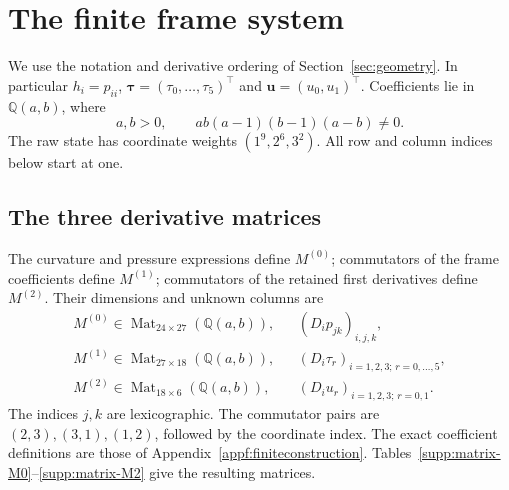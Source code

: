 \section{The finite frame system}\label{supp:frame}

We use the notation and derivative ordering of
Section~\ref{sec:geometry}. In particular $h_i=p_{ii}$,
$\boldsymbol\tau=(\tau_0,\ldots,\tau_5)^{\top}$ and
$\boldsymbol u=(u_0,u_1)^{\top}$. Coefficients lie in
$\mathbb Q(a,b)$, where
\[
 a,b>0,\qquad ab(a-1)(b-1)(a-b)\ne0.
\]
The raw state has coordinate weights $(1^9,2^6,3^2)$.
All row and column indices below start at one.

\subsection{The three derivative matrices}

The curvature and pressure expressions define $M^{(0)}$; commutators
of the frame coefficients define $M^{(1)}$; commutators of the
retained first derivatives define $M^{(2)}$. Their dimensions and
unknown columns are
\[
\begin{array}{ccl}
 M^{(0)}\in\operatorname{Mat}_{24\times27}(\mathbb Q(a,b)),
 & & (D_ip_{jk})_{i,j,k},\\
 M^{(1)}\in\operatorname{Mat}_{27\times18}(\mathbb Q(a,b)),
 & & (D_i\tau_r)_{i=1,2,3;\,r=0,\ldots,5},\\
 M^{(2)}\in\operatorname{Mat}_{18\times6}(\mathbb Q(a,b)),
 & & (D_iu_r)_{i=1,2,3;\,r=0,1}.
\end{array}
\]
The indices $j,k$ are lexicographic. The commutator pairs are
$(2,3),(3,1),(1,2)$, followed by the coordinate index. The exact
coefficient definitions are those of Appendix~\ref{appf:finiteconstruction}.
Tables~\ref{supp:matrix-M0}--\ref{supp:matrix-M2} give the resulting matrices.

